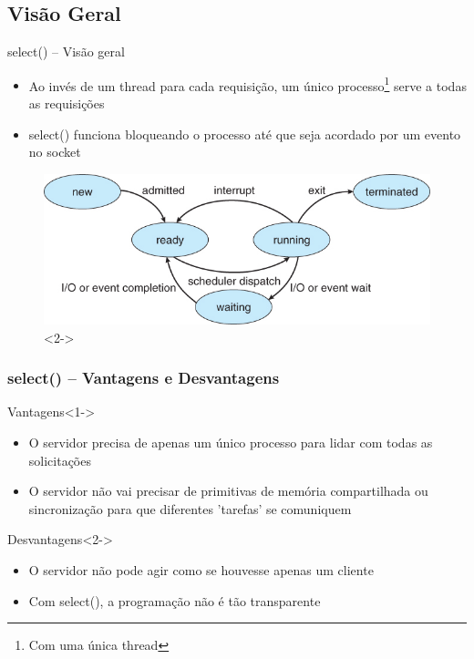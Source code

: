 \documentclass[10pt, xcolor=x11names]{beamer}
\begin{document}
\subsection{Visão Geral}
\begin{frame}
	\begin{block}{select() -- Visão geral}
		\begin{itemize}
			\item<1-> Ao invés de um thread para cada requisição, um único processo\footnote{Com uma única thread} serve a todas as requisições
			\item<2-> select() funciona bloqueando o processo até que seja acordado por um evento no socket
		\end{itemize}
	\end{block}

	\begin{figure}
		\includegraphics[width=.5\linewidth]{img/process_states.png}<2->
	\end{figure}
	
\end{frame}

\begin{frame}\frametitle{select() -- Vantagens e Desvantagens}
	\begin{block}{Vantagens}<1->
		\begin{itemize}
			\item O servidor precisa de apenas um único processo para lidar com todas as solicitações

			\item O servidor não vai precisar de primitivas de memória compartilhada ou sincronização para que diferentes 'tarefas' se comuniquem
		\end{itemize}
	\end{block}

	\begin{alertblock}{Desvantagens}<2->
		\begin{itemize}
			\item O servidor não pode agir como se houvesse apenas um cliente
			\item Com select(), a programação não é tão transparente
		\end{itemize}
	\end{alertblock}
	
\end{frame}
\end{document}
